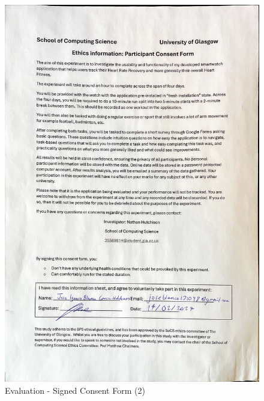 \documentclass{l4proj}
\begin{document}
\begin{figure}[h!]
    \centering
    \includegraphics[width=1\linewidth]{dissertation//dissImages/Consent2.jpg}
    \caption{Evaluation - Signed Consent Form (2)}
\end{figure}
\end{document}
